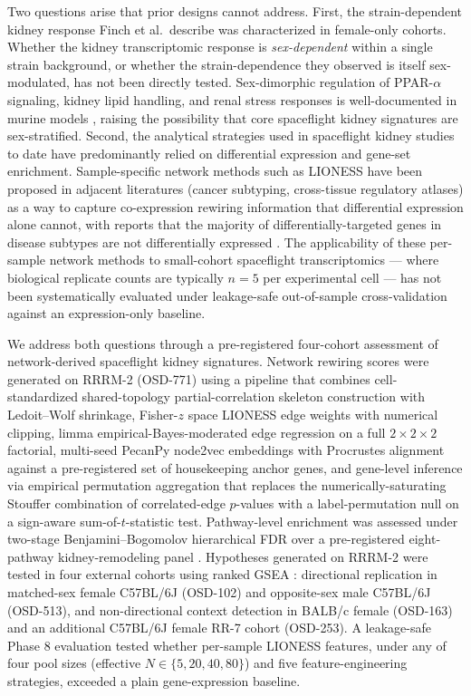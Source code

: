 \documentclass[11pt]{article}
\newcommand{\pkg}[1]{\textsf{#1}}
\begin{document}
Two questions arise that prior designs cannot address. First, the strain-dependent kidney response Finch et al.\ describe was characterized in female-only cohorts. Whether the kidney transcriptomic response is \emph{sex-dependent} within a single strain background, or whether the strain-dependence they observed is itself sex-modulated, has not been directly tested. Sex-dimorphic regulation of PPAR-$\alpha$ signaling, kidney lipid handling, and renal stress responses is well-documented in murine models \citep{magee2018hepatocyte, proctor2006regulation}, raising the possibility that core spaceflight kidney signatures are sex-stratified. Second, the analytical strategies used in spaceflight kidney studies to date have predominantly relied on differential expression and gene-set enrichment. Sample-specific network methods such as LIONESS \citep{kuijjer2019estimating} have been proposed in adjacent literatures (cancer subtyping, cross-tissue regulatory atlases) as a way to capture co-expression rewiring information that differential expression alone cannot, with reports that the majority of differentially-targeted genes in disease subtypes are not differentially expressed \citep{lopes2020gene, fagny2017exploring}. The applicability of these per-sample network methods to small-cohort spaceflight transcriptomics --- where biological replicate counts are typically $n{=}5$ per experimental cell --- has not been systematically evaluated under leakage-safe out-of-sample cross-validation against an expression-only baseline.

We address both questions through a pre-registered four-cohort assessment of network-derived spaceflight kidney signatures. Network rewiring scores were generated on RRRM-2 (OSD-771) using a pipeline that combines cell-standardized shared-topology partial-correlation skeleton construction with Ledoit--Wolf shrinkage, Fisher-$z$ space LIONESS edge weights with numerical clipping, limma empirical-Bayes-moderated edge regression on a full $2{\times}2{\times}2$ factorial, multi-seed \pkg{PecanPy} \pkg{node2vec} embeddings with Procrustes alignment against a pre-registered set of housekeeping anchor genes, and gene-level inference via empirical permutation aggregation that replaces the numerically-saturating Stouffer combination of correlated-edge $p$-values with a label-permutation null on a sign-aware sum-of-$t$-statistic test. Pathway-level enrichment was assessed under two-stage Benjamini--Bogomolov hierarchical FDR over a pre-registered eight-pathway kidney-remodeling panel \citep{benjamini2014selective}. Hypotheses generated on RRRM-2 were tested in four external cohorts using ranked GSEA \citep{subramanian2005gene}: directional replication in matched-sex female C57BL/6J (OSD-102) and opposite-sex male C57BL/6J (OSD-513), and non-directional context detection in BALB/c female (OSD-163) and an additional C57BL/6J female RR-7 cohort (OSD-253). A leakage-safe Phase 8 evaluation tested whether per-sample LIONESS features, under any of four pool sizes (effective $N\in\{5,20,40,80\}$) and five feature-engineering strategies, exceeded a plain gene-expression baseline.
\end{document}
